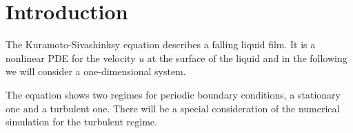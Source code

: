 \section{Introduction}
The Kuramoto-Sivashinksy equation describes a falling liquid film. It is a nonlinear PDE for the velocity $u$ at the surface of the liquid and in the following we will consider a one-dimensional system.

The equation shows two regimes for periodic boundary conditions, a stationary one and a turbulent one. There will be a special consideration of the numerical simulation for the turbulent regime.
